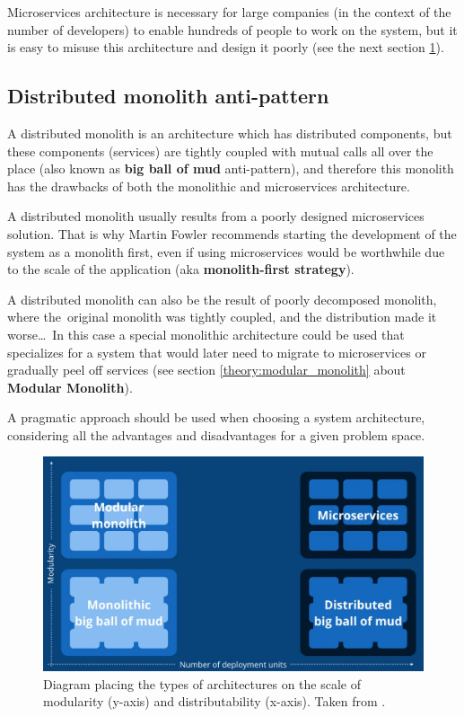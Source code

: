 Microservices architecture is necessary for large companies (in the context of the number of developers) to enable hundreds of people to work on the system, but it is easy to misuse this architecture and design it poorly (see the next section \ref{fig:distributed_monolith}).

\subsection{Distributed monolith anti-pattern}
\label{theory:distributed_monolith}
A distributed monolith is an architecture which has distributed components, but these components (services) are tightly coupled with mutual calls all over the place (also known as \textbf{big ball of mud} anti-pattern), and therefore this monolith has the drawbacks of both the monolithic and microservices architecture. 

A distributed monolith usually results from a poorly designed microservices solution. That is why Martin Fowler \cite{martin_fowler:monlith_first} recommends starting the development of the system as a monolith first, even if using microservices would be worthwhile due to the scale of the application (aka \textbf{monolith-first strategy}). 

A distributed monolith can also be the result of poorly decomposed monolith, where the~original monolith was tightly coupled, and the distribution made it worse\dots~In this case a special monolithic architecture could be used that specializes for a system that would later need to migrate to microservices or gradually peel off services (see section \ref{theory:modular_monolith} about \textbf{Modular Monolith}).

A pragmatic approach should be used when choosing a system architecture, considering all the advantages and disadvantages for a given problem space.

\begin{figure} [H]
    \centering
    \includegraphics[width=\textwidth]{figures/dm.png}
    \caption{Diagram placing the types of architectures on the scale of modularity (y-axis) and distributability (x-axis). Taken from \cite{kirsten_westende:modular_monolith}.}
    \label{fig:distributed_monolith}
\end{figure}

